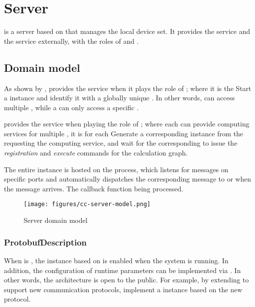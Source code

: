 \section{Server}
\begin{content}
 is a server based on  that manages the local device set. It provides the  service and the  service externally, with the roles of  and .


\subsection{Domain model}
As shown by ,  provides the  service when it plays the role of ; where it is the  Start a  instance and identify it with a globally unique . In other words,  can access multiple , while a  can only access a specific .

 provides the  service when playing the role of ; where each  can provide computing services for multiple , it is for each Generate a corresponding  instance from the  requesting the computing service, and wait for the corresponding  to issue the \emph{registration} and \emph{execute} commands for the calculation graph.

The entire  instance is hosted on the  process, which listens for messages on specific ports and automatically dispatches the corresponding message to  or  when the message arrives. The callback function being processed.

\begin{figure}[H]
  \centering
  \texttt{[image: figures/cc-server-model.png]}
  \caption{Server domain model}
  \label{fig:cc-server-model}
\end{figure}


\subsubsection{ProtobufDescription}
When  is , the  instance based on  is enabled when the system is running. In addition, the configuration of runtime parameters can be implemented via . In other words, the \tf{} architecture is open to the public. For example, by extending  to support new communication protocols, implement a  instance based on the new protocol.


\end{content}
